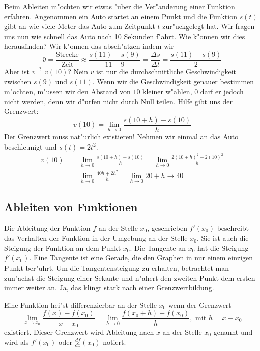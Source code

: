 Beim Ableiten m"ochten wir etwas "uber die Ver"anderung einer Funktion erfahren. Angenommen ein Auto startet an einem Punkt und die Funktion $s(t)$ gibt an wie viele Meter das Auto zum Zeitpunkt $t$ zur"uckgelegt hat. Wir fragen uns nun wie schnell das Auto nach 10 Sekunden f"ahrt. Wie k"onnen wir dies herausfinden? Wir k"onnen das absch"atzen indem wir 
\begin{equation*}
\bar{v} = \frac{\text{Strecke}}{\text{Zeit}} \approx \frac{s(11) - s(9)}{11 - 9} = \frac{\Delta s}{\Delta t} = \frac{s(11) - s(9)}{2}
\end{equation*}
Aber ist $\bar{v} \stackrel{?}{=} v(10)$? Nein $\bar{v}$ ist nur die durchschnittliche Geschwindigkeit zwischen $s(9)$ und $s(11)$. Wenn wir die Geschwindigkeit genauer bestimmen m"ochten, m"ussen wir den Abstand von $10$ kleiner w"ahlen, $0$ darf er jedoch nicht werden, denn wir d"urfen nicht durch Null teilen. Hilfe gibt uns der Grenzwert:
\begin{equation*}
v(10) = \lim\limits_{h \to 0} \frac{s(10+h) - s(10)}{h}
\end{equation*}
Der Grenzwert muss nat"urlich existieren! Nehmen wir einmal an das Auto beschleunigt und $s(t) = 2 t^2$.
\begin{align*}
v(10) &= \lim\limits_{h \to 0} \frac{s(10+h) - s(10)}{h} = \lim\limits_{h \to 0} \frac{2 (10+h)^2 - 2 (10)^2}{h}\\
&= \lim\limits_{h \to 0} \frac{40h + 2h^2}{h} = \lim\limits_{h \to 0} 20 + h \to 40
\end{align*}

\subsection{Ableiten von Funktionen}
Die Ableitung der Funktion $f$ an der Stelle $x_0$, geschrieben $f'(x_0)$ beschreibt das Verhalten der Funktion in der Umgebung an der Stelle $x_0$. Sie ist auch die Steigung der Funktion an dem Punkt $x_0$. Die Tangente an $x_0$ hat die Steigung $f'(x_0)$. Eine Tangente ist eine Gerade, die den Graphen in nur einem einzigen Punkt ber"uhrt. Um die Tangentensteigung zu erhalten, betrachtet man zun"achst die Steigung einer Sekante und n"ahert den zweiten Punkt dem ersten immer weiter an. Ja, das klingt stark nach einer Grenzwertbildung. 
\begin{definition}[Differenzierbarkeit in $x_0$]
Eine Funktion hei"st differenzierbar an der Stelle $x_0$ wenn der Grenzwert
\begin{equation*}
 \lim\limits_{x \to x_0} \frac{f(x)-f(x_0)}{x-x_0} = \lim\limits_{h \to 0}  \frac{f(x_0 + h)-f(x_0)}{h} , \text{ mit } h = x - x_0
\end{equation*}
existiert. Dieser Grenzwert wird Ableitung nach $x$ an der Stelle $x_0$ genannt und wird als $f'(x_0)$ oder $\frac{df}{dx}(x_0)$ notiert.
\end{definition}

